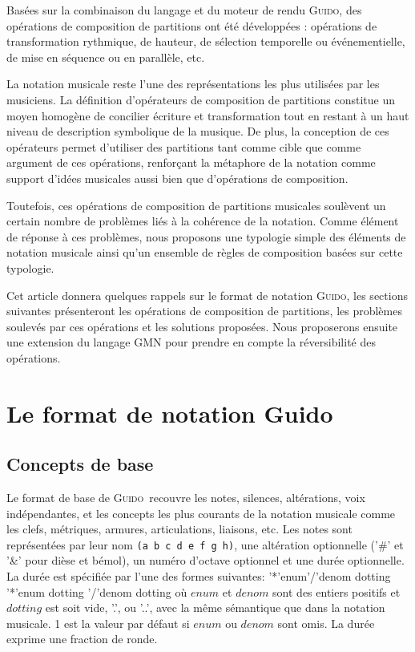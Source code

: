 \documentclass{article}
\newenvironment{gmncode}		{\vspace{-2mm}\small\verbatim}{\endverbatim\vspace{-2mm}}
\newcommand{\Guido}		{\textsc{Guido}}
\begin{document}
Basées sur la combinaison du langage et du moteur de rendu \Guido , des opérations de composition de partitions ont été développées : opérations de transformation rythmique, de hauteur, de sélection temporelle ou événementielle, de mise en séquence ou en parallèle, etc.

La notation musicale reste l'une des représentations les plus utilisées par les musiciens. La définition d'opérateurs de composition de partitions constitue un moyen homogène de concilier écriture et transformation tout en restant à un haut niveau de description symbolique de la musique. De plus, la conception de ces opérateurs permet d'utiliser des partitions tant comme cible que comme argument de ces opérations, renforçant la métaphore de la notation comme support d'idées musicales aussi bien que d'opérations de composition.

Toutefois, ces opérations de composition de partitions musicales soulèvent un certain nombre de problèmes liés à la cohérence de la notation. Comme élément de réponse à ces problèmes, nous proposons une typologie simple des éléments de notation musicale ainsi qu'un ensemble de règles de composition basées sur cette typologie.

Cet article donnera quelques rappels sur le format de notation \Guido , les sections suivantes présenteront les opérations de composition de partitions, les problèmes soulevés par ces opérations et les solutions proposées. Nous proposerons ensuite une extension du langage GMN pour prendre  en compte la réversibilité des opérations.

\section{Le format de notation Guido}

\subsection{Concepts de base}
Le format de base de \Guido\ recouvre les notes, silences, altérations, voix indépendantes, et les concepts les plus courants de la notation musicale comme les clefs, métriques, armures, articulations, liaisons, etc.
Les notes sont représentées par leur nom \texttt{(a b c d e f g h)}, une altération optionnelle ('\#' et '\&' pour dièse et bémol), un numéro d'octave optionnel et une durée optionnelle. \\
La durée est spécifiée par l'une des formes suivantes: 
\begin{gmncode} 
   '*'enum'/'denom dotting
   '*'enum dotting 
   '/'denom dotting
\end{gmncode} 
\noindent où $enum$ et $denom$ sont des entiers positifs et $dotting$ est soit vide, '.', ou '..', avec la même sémantique que dans la notation musicale. 1 est la valeur par défaut si $enum$ ou $denom$ sont omis. La durée exprime une fraction de ronde.
\end{document}
